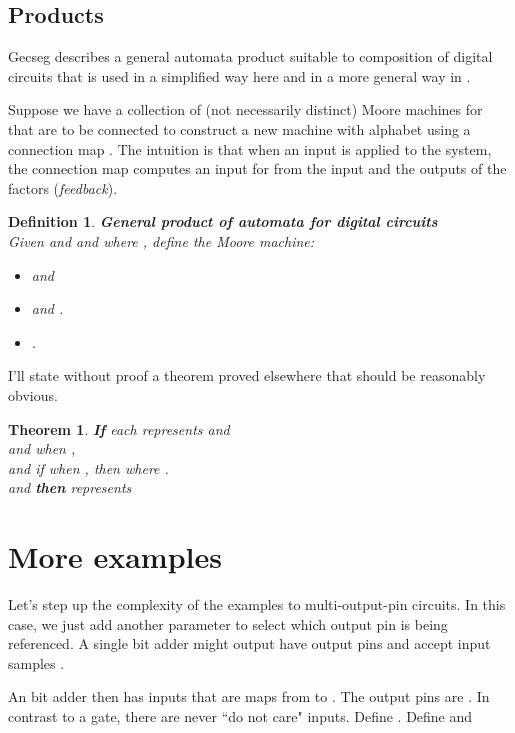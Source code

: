 \documentclass[runningheads,letter]{llncs}
\newtheorem{thm}{Theorem}
\newtheorem{dfn}{Definition}[section]
\begin{document}
\subsection{Products}

Gecseg\cite{Gecseg}  describes a general automata product suitable to composition of digital circuits that is used in a simplified way here and in a more
general way in \cite{yodaikenprpresent}.

Suppose we have a collection of (not necessarily distinct) Moore machines
 for 
that are to be connected to construct a new machine with alphabet  
using a connection map .
The intuition is that when an input  is applied to the system,
the connection map computes an input for
 from the input  and the outputs of the factors (\emph{feedback}).

\begin{dfn}{\rm
\textbf{General product of automata for digital circuits}\\
Given  and  and 
 where , define the Moore machine:
\\
\begin{itemize}
\item  and 
\item  and .
\item .
\end{itemize} }
\end{dfn}

I'll state without proof a theorem proved elsewhere that should be reasonably
obvious\cite{yodaikenprpresent}.
\begin{thm}\label{thm:main}{\rm
\textbf{If} each  represents 
and \\
and when , \\
and if when , then  where .\\
and 
\textbf{then}  represents 
}\end{thm}

\section{More examples\label{sec:example2}}

Let's step up the complexity of the examples to  multi-output-pin circuits.
In this case, we just add another parameter to select which output pin is
being referenced.
A single bit adder might output have output pins
 and accept
input samples . 


An  bit  adder then has inputs that are maps from 
 to .  The output pins are . In contrast to a gate, there are never
``do not care" inputs. Define . Define 
and 
\end{document}
